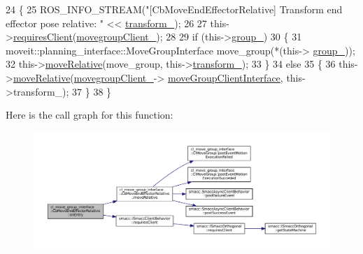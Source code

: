 \begin{DoxyCode}
24     \{
25         ROS\_INFO\_STREAM(\textcolor{stringliteral}{"[CbMoveEndEffectorRelative] Transform end effector pose relative: "} << 
      \hyperlink{classcl__move__group__interface_1_1CbMoveEndEffectorRelative_af17928d796ebd565451dd0ac216f0dc6}{transform\_});
26 
27         this->\hyperlink{classsmacc_1_1ISmaccClientBehavior_a32b16e99e3b4cb289414203dc861a440}{requiresClient}(\hyperlink{classcl__move__group__interface_1_1CbMoveEndEffectorRelative_ae742e6382bfb47fd9e1458bd6c8d3255}{movegroupClient\_});
28 
29         \textcolor{keywordflow}{if} (this->\hyperlink{classcl__move__group__interface_1_1CbMoveEndEffectorRelative_a1bb9caf9c715a5d10ea38ab46c297adb}{group\_})
30         \{
31             moveit::planning\_interface::MoveGroupInterface move\_group(*(this->
      \hyperlink{classcl__move__group__interface_1_1CbMoveEndEffectorRelative_a1bb9caf9c715a5d10ea38ab46c297adb}{group\_}));
32             this->\hyperlink{classcl__move__group__interface_1_1CbMoveEndEffectorRelative_ab9498fefa83f46b974ce5b13df7dbd16}{moveRelative}(move\_group, this->\hyperlink{classcl__move__group__interface_1_1CbMoveEndEffectorRelative_af17928d796ebd565451dd0ac216f0dc6}{transform\_});
33         \}
34         \textcolor{keywordflow}{else}
35         \{
36             this->\hyperlink{classcl__move__group__interface_1_1CbMoveEndEffectorRelative_ab9498fefa83f46b974ce5b13df7dbd16}{moveRelative}(\hyperlink{classcl__move__group__interface_1_1CbMoveEndEffectorRelative_ae742e6382bfb47fd9e1458bd6c8d3255}{movegroupClient\_}->
      \hyperlink{classcl__move__group__interface_1_1ClMoveGroup_a92922ea689e4e1b7b91512c56629c95b}{moveGroupClientInterface}, this->transform\_);
37         \}
38     \}
\end{DoxyCode}
Here is the call graph for this function\+:
\nopagebreak
\begin{figure}[H]
\begin{center}
\leavevmode
\includegraphics[width=350pt]{classcl__move__group__interface_1_1CbMoveEndEffectorRelative_a805a9d0f85ecdb1f503c1d6349ed9036_cgraph}
\end{center}
\end{figure}
\mbox{\label{classcl__move__group__interface_1_1CbMoveEndEffectorRelative_a429a45cbde9b3b36c732958e9dd2811c}} 
